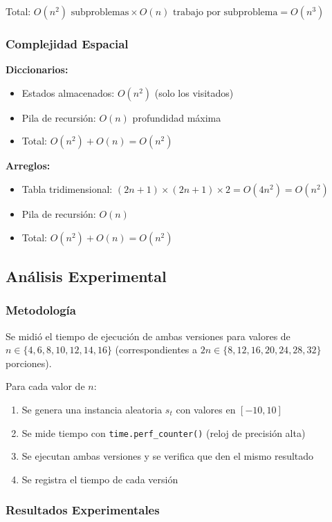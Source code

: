 \documentclass[12pt,letterpaper]{article}
\begin{document}
Total: $O(n^2) \text{ subproblemas} \times O(n) \text{ trabajo por subproblema} = O(n^3)$

\subsubsection{Complejidad Espacial}

\textbf{Diccionarios:}
\begin{itemize}
    \item Estados almacenados: $O(n^2)$ (solo los visitados)
    \item Pila de recursión: $O(n)$ profundidad máxima
    \item Total: $O(n^2) + O(n) = O(n^2)$
\end{itemize}

\textbf{Arreglos:}
\begin{itemize}
    \item Tabla tridimensional: $(2n+1) \times (2n+1) \times 2 = O(4n^2) = O(n^2)$
    \item Pila de recursión: $O(n)$
    \item Total: $O(n^2) + O(n) = O(n^2)$
\end{itemize}

\subsection{Análisis Experimental}

\subsubsection{Metodología}

Se midió el tiempo de ejecución de ambas versiones para valores de $n \in \{4, 6, 8, 10, 12, 14, 16\}$ (correspondientes a $2n \in \{8, 12, 16, 20, 24, 28, 32\}$ porciones).

Para cada valor de $n$:
\begin{enumerate}
    \item Se genera una instancia aleatoria $s_t$ con valores en $[-10, 10]$
    \item Se mide tiempo con \texttt{time.perf\_counter()} (reloj de precisión alta)
    \item Se ejecutan ambas versiones y se verifica que den el mismo resultado
    \item Se registra el tiempo de cada versión
\end{enumerate}

\subsubsection{Resultados Experimentales}
\end{document}
